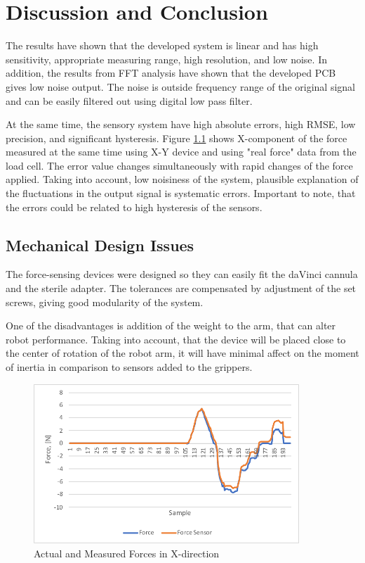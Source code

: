\chapter{Discussion and Conclusion}
\label{discuss} %

The results have shown that the developed system is linear and has high sensitivity, appropriate measuring range, high resolution, and low noise. In addition, the results from FFT analysis have shown that the developed PCB gives low noise output. The noise is outside frequency range of the original signal and can be easily filtered out using digital low pass filter.

At the same time, the sensory system have high absolute errors, high RMSE, low precision, and significant hysteresis. Figure \ref{fig:Syst_err} shows X-component of the force measured at the same time using X-Y device and using "real force" data from the load cell. The error value changes simultaneously with rapid changes of the force applied. Taking into account, low noisiness of the system, plausible explanation of the fluctuations in the output signal is systematic errors. Important to note, that the errors could be related to high hysteresis of the sensors.

\section{Mechanical Design Issues}

The force-sensing devices were designed so they can easily fit the daVinci cannula and the sterile adapter. The tolerances are compensated by adjustment of the set screws, giving good modularity of the system.

One of the disadvantages is addition of the weight to the arm, that can alter robot performance. Taking into account, that the device will be placed close to the center of rotation of the robot arm, it will have minimal affect on the moment of inertia in comparison to sensors added to the grippers.

\begin{figure}[h]
	\begin{center}
	\includegraphics[width=100mm]{fig/results/syst_error.pdf}
	\end{center}
	\vspace{-4mm}
	\caption[Actual and Measured Forces in X-direction]
	{Actual and Measured Forces in X-direction}
	\label{fig:Syst_err}
	\vspace{-2mm}
\end{figure}

